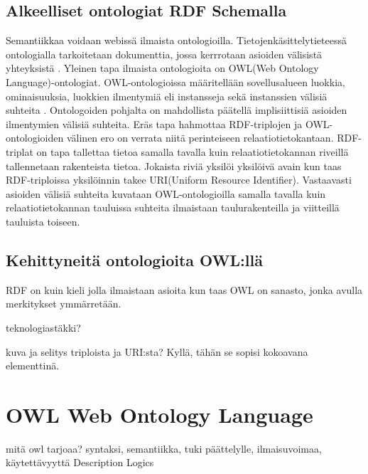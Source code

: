 \documentclass[a4paper,10pt]{article}
\begin{document}
\subsection{Alkeelliset ontologiat RDF Schemalla}
Semantiikkaa voidaan webissä ilmaista ontologioilla. Tietojenkäsittelytieteessä ontologialla tarkoitetaan dokumenttia, jossa kerrrotaan asioiden välisistä yhteyksistä \cite{BHL01}. 
Yleinen tapa ilmaista ontologioita on OWL(Web Ontology Language)-ontologiat. OWL-ontologioissa määritellään sovellusalueen luokkia, ominaisuuksia, luokkien ilmentymiä eli instansseja  sekä instanssien välisiä suhteita \cite{SWM04}. Ontologoiden pohjalta on mahdollista päätellä implisiittisiä asioiden ilmentymien välisiä suhteita. Eräs tapa hahmottaa RDF-triplojen ja OWL-ontologioiden välinen ero on verrata niitä perinteiseen relaatiotietokantaan. RDF-triplat on tapa tallettaa tietoa samalla tavalla kuin relaatiotietokannan riveillä tallennetaan rakenteista tietoa. Jokaista riviä yksilöi yksilöivä avain kun taas RDF-triploissa yksilöinnin takee URI(Uniform Resource Identifier). Vastaavasti asioiden välisiä suhteita kuvataan OWL-ontologioilla samalla tavalla kuin relaatiotietokannan tauluissa suhteita ilmaistaan taulurakenteilla ja viitteillä tauluista toiseen. 
\subsection{Kehittyneitä ontologioita OWL:llä}
RDF on kuin kieli jolla ilmaistaan asioita kun taas OWL on sanasto, jonka avulla merkitykset ymmärretään. 

teknologiastäkki?

kuva ja selitys triploista ja URI:sta? Kyllä, tähän se sopisi kokoavana elementtinä.


\section{OWL Web Ontology Language}

mitä owl tarjoaa? syntaksi, semantiikka, tuki päättelylle, ilmaisuvoimaa, käytettävyyttä
Description Logics
\end{document}
